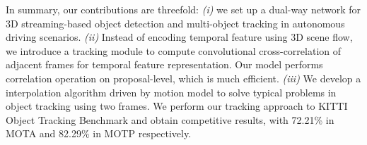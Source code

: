 \documentclass[letterpaper, 10 pt, conference]{ieeeconf}  %
\def\figurename{\emph{Figure}}
\begin{document}
In summary, our contributions are threefold: \textit{(i)} we set up a dual-way network for 3D streaming-based object detection and multi-object tracking in autonomous driving scenarios. \textit{(ii)} Instead of encoding temporal feature using 3D scene flow, we introduce a tracking module to compute convolutional cross-correlation of adjacent frames for temporal feature representation. Our model performs correlation operation on proposal-level, which is much efficient. \textit{(iii)} We develop a interpolation algorithm driven by motion model to solve typical problems in object tracking using two frames. We perform our tracking approach to KITTI Object Tracking Benchmark and obtain competitive results, with 72.21\% in MOTA and 82.29\% in MOTP respectively.



\end{document}
